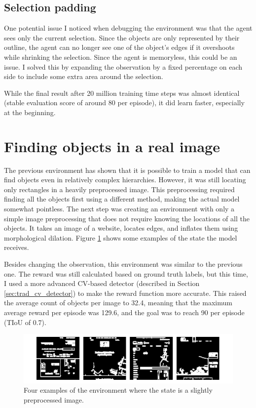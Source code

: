 \documentclass[
  digital,     %
  oneside,     %
  nosansbold,  %
  nocolorbold, %
  lof,         %
  lot,         %
]{fithesis4}
\begin{document}
\subsection{Selection padding}

One potential issue I noticed when debugging the environment was that the agent sees only the current selection. Since the objects are only represented by their outline, the agent can no longer see one of the object's edges if it overshoots while shrinking the selection. Since the agent is memoryless, this could be an issue. I solved this by expanding the observation by a fixed percentage on each side to include some extra area around the selection.

While the final result after 20 million training time steps was almost identical (stable evaluation score of around 80 per episode), it did learn faster, especially at the beginning.

\section{Finding objects in a real image}

The previous environment has shown that it is possible to train a model that can find objects even in relatively complex hierarchies. However, it was still locating only rectangles in a heavily preprocessed image. This preprocessing required finding all the objects first using a different method, making the actual model somewhat pointless. The next step was creating an environment with only a simple image preprocessing that does not require knowing the locations of all the objects. It takes an image of a website, locates edges, and inflates them using morphological dilation. Figure \ref{fig:env9} shows some examples of the state the model receives.

Besides changing the observation, this environment was similar to the previous one. The reward was still calculated based on ground truth labels, but this time, I used a more advanced CV-based detector (described in Section \ref{sec:trad_cv_detector}) to make the reward function more accurate. This raised the average count of objects per image to 32.4, meaning that the maximum average reward per episode was 129.6, and the goal was to reach 90 per episode (TIoU of 0.7).

\begin{figure}
    \centering
    \includegraphics[width=1\linewidth]{env_examples/env9.pdf}
    \caption{Four examples of the environment where the state is a slightly preprocessed image.}
    \label{fig:env9}
\end{figure}
\end{document}
